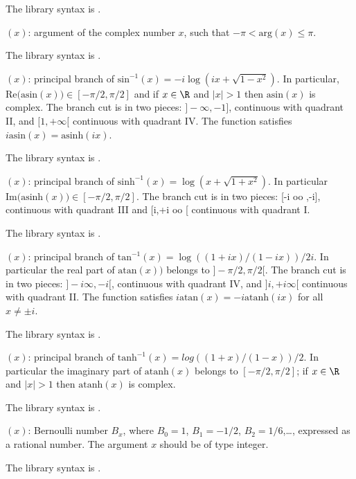 The library syntax is .

$(x)$: \label{se:arg}argument of the complex number $x$, such that $-\pi<\text{arg}(x)\le\pi$.

The library syntax is .

$(x)$: \label{se:asin}principal branch of $\text{sin}^{-1}(x) = -i \log(ix + \sqrt{1 - x^2})$.
In particular, $\text{Re(asin}(x))\in [-\pi/2,\pi/2]$ and if $x\in \R$ and
$|x|>1$ then $\text{asin}(x)$ is complex. The branch cut is in two pieces:
$]-\infty,-1]$, continuous with quadrant II, and $[1,+\infty[$ continuous
with quadrant IV. The function satisfies $i \text{asin}(x) =
\text{asinh}(ix)$.

The library syntax is .

$(x)$: \label{se:asinh}principal branch of $\text{sinh}^{-1}(x) = \log(x + \sqrt{1+x^2})$. In
particular $\text{Im(asinh}(x))\in [-\pi/2,\pi/2]$.
The branch cut is in two pieces: [-i oo ,-i],  continuous with quadrant III
and [i,+i oo [ continuous with quadrant I.

The library syntax is .

$(x)$: \label{se:atan}principal branch of $\text{tan}^{-1}(x) = \log ((1+ix)/(1-ix)) /
2i$. In particular the real part of $\text{atan}(x))$ belongs to
$]-\pi/2,\pi/2[$.
The branch cut is in two pieces:
$]-i\infty,-i[$, continuous with quadrant IV, and $]i,+i \infty[$ continuous
with quadrant II. The function satisfies $i \text{atan}(x) =
-i\text{atanh}(ix)$ for all $x\neq \pm i$.

The library syntax is .

$(x)$: \label{se:atanh}principal branch of $\text{tanh}^{-1}(x) = log ((1+x)/(1-x)) / 2$. In
particular the imaginary part of $\text{atanh}(x)$ belongs to
$[-\pi/2,\pi/2]$; if $x\in \R$ and $|x|>1$ then $\text{atanh}(x)$ is complex.

The library syntax is .

$(x)$: \label{se:bernfrac}Bernoulli number $B_x$,
where $B_0=1$, $B_1=-1/2$, $B_2=1/6$,\dots, expressed as a rational number.
The argument $x$ should be of type integer.

The library syntax is .

